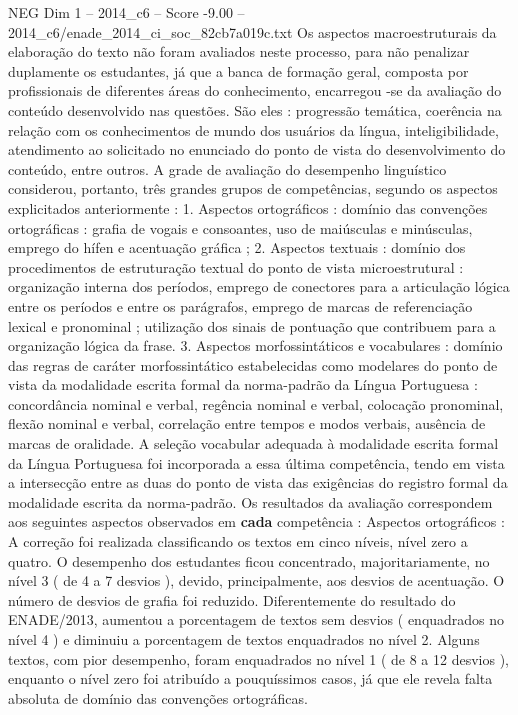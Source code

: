 \begin{textsample}{NEG Dim 1 – 2014\_c6 – Score -9.00 – 2014\_c6/enade\_2014\_ci\_soc\_82cb7a019c.txt}
Os aspectos macroestruturais da elaboração do texto não foram avaliados neste processo, para não penalizar duplamente os estudantes, já que a banca de formação geral, composta por profissionais de diferentes áreas do conhecimento, encarregou -se da avaliação do conteúdo desenvolvido nas questões.
São eles : progressão temática, coerência na relação com os conhecimentos de mundo dos usuários da língua, inteligibilidade, atendimento ao solicitado no enunciado do ponto de vista do desenvolvimento do conteúdo, entre outros.
A grade de avaliação do desempenho linguístico considerou, portanto, três grandes grupos de competências, segundo os aspectos explicitados anteriormente : 1.
Aspectos ortográficos : domínio das convenções ortográficas : grafia de vogais e consoantes, uso de maiúsculas e minúsculas, emprego do hífen e acentuação gráfica ; 2.
Aspectos textuais : domínio dos procedimentos de estruturação textual do ponto de vista microestrutural : organização interna dos períodos, emprego de conectores para a articulação lógica entre os períodos e entre os parágrafos, emprego de marcas de referenciação lexical e pronominal ; utilização dos sinais de pontuação que contribuem para a organização lógica da frase. 3.
Aspectos morfossintáticos e vocabulares : domínio das regras de caráter morfossintático estabelecidas como modelares do ponto de vista da modalidade escrita formal da norma-padrão da Língua Portuguesa : concordância nominal e verbal, regência nominal e verbal, colocação pronominal, flexão nominal e verbal, correlação entre tempos e modos verbais, ausência de marcas de oralidade.
A seleção vocabular adequada à modalidade escrita formal da Língua Portuguesa foi incorporada a essa última competência, tendo em vista a intersecção entre as duas do ponto de vista das exigências do registro formal da modalidade escrita da norma-padrão.
Os resultados da avaliação correspondem aos seguintes aspectos observados em \textbf{cada} competência : Aspectos ortográficos : A correção foi realizada classificando os textos em cinco níveis, nível zero a quatro.
O desempenho dos estudantes ficou concentrado, majoritariamente, no nível 3 ( de 4 a 7 desvios ), devido, principalmente, aos desvios de acentuação.
O número de desvios de grafia foi reduzido.
Diferentemente do resultado do ENADE/2013, aumentou a porcentagem de textos sem desvios ( enquadrados no nível 4 ) e diminuiu a porcentagem de textos enquadrados no nível 2.
Alguns textos, com pior desempenho, foram enquadrados no nível 1 ( de 8 a 12 desvios ), enquanto o nível zero foi atribuído a pouquíssimos casos, já que ele revela falta absoluta de domínio das convenções ortográficas.

\end{textsample}
